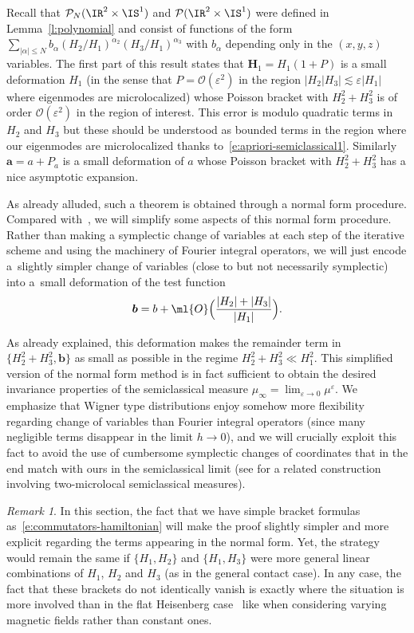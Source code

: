 \documentclass[10pt]{amsart}
\theoremstyle{plain}
\theoremstyle{definition}
\theoremstyle{remark}
\newtheorem{rema}[theo]{Remark}
\begin{document}
Recall that $\mathcal{P}_N(\IR^2\times \IS^1)$ and $\mathcal{P}(\IR^2\times \IS^1)$ were defined in Lemma~\ref{l:polynomial} and consist of functions of the form $\sum_{|\alpha|\leq N} b_\alpha(H_2/H_1)^{\alpha_2}(H_3/H_1)^{\alpha_3}$ with $b_\alpha$ depending only in the $(x,y,z)$ variables. The first part of this result states that $\boldsymbol{H}_1=H_1(1+P)$ is a small deformation $H_1$ (in the sense that $P=\mathcal{O}(\varepsilon^2)$ in the region $|H_2|H_3|\lesssim\varepsilon|H_1|$ where eigenmodes are microlocalized) whose Poisson bracket with $H_2^2+H_3^2$ is of order $\mathcal{O}(\varepsilon^2)$ in the region of interest. This error is modulo quadratic terms in $H_2$ and $H_3$ but these should be understood as bounded terms in the region where our eigenmodes are microlocalized thanks to~\eqref{e:apriori-semiclassical1}. Similarly $\boldsymbol{a}=a+P_a$ is a small deformation of $a$ whose Poisson bracket with $H_2^2+H_3^2$ has a nice asymptotic expansion.

As already alluded, such a theorem is obtained through a normal form procedure. Compared with~\cite{ColindeVerdiereHillairetTrelat15}, we will simplify some aspects of this normal form procedure. Rather than making a symplectic change of variables at each step of the iterative scheme and using the machinery of Fourier integral operators, we will just encode a~slightly simpler change of variables (close to but not necessarily symplectic) into a~small deformation of the test function
\[
\boldsymbol{b} = b + \ml{O}\Bigl(\frac{ \vert H_2 \vert + \vert H_3 \vert}{\vert H_1 \vert} \Bigr).
\]

As already explained, this deformation makes the remainder term in $\{H_2^2+H_3^2, \boldsymbol{b}\}$ as small as possible in the regime $H_2^2+H_3^2\ll H_1^2$.
This simplified version of the normal form method is in fact sufficient to obtain the desired invariance properties of the semiclassical measure $\mu_\infty = \lim_{\varepsilon \to 0} \mu^\varepsilon$. We emphasize that Wigner type distributions enjoy somehow more flexibility regarding change of variables than Fourier integral operators (since many negligible terms disappear in the limit $h \to 0$), and we will crucially exploit this fact to avoid the use of cumbersome symplectic changes of coordinates that in the end match with ours in the semiclassical limit (see \cite[\S3.1]{ArnaizSun22} for a related construction involving two-microlocal semiclassical measures).

\begin{rema} In this section, the fact that we have simple bracket formulas as~\eqref{e:commutators-hamiltonian} will make the proof slightly simpler and more explicit regarding the terms appearing in the normal form. Yet, the strategy would remain the same if $\{H_1,H_2\}$ and $\{H_1,H_3\}$ were more general linear combinations of $H_1$, $H_2$ and $H_3$ (as in the general contact case). In any case, the fact that these brackets do not identically vanish is exactly where the situation is more involved than in the flat Heisenberg case~\cite{FermanianFischer21, FermanianLetrouit20} like when considering varying magnetic fields rather than constant ones.
\end{rema}
\end{document}
